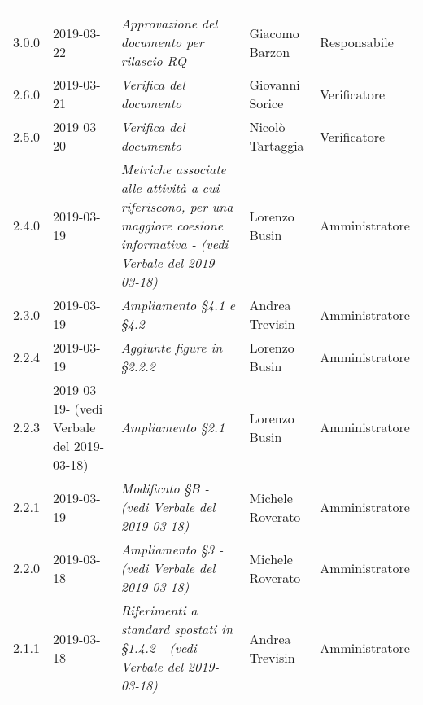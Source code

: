 \newpage 
\section*{}
	\begin{longtable}{C{2cm}|C{2.5cm}|C{4.5cm}|C{2.5cm}|C{3cm}}

		 &  &  &  &   \\
		\endhead
		
		3.0.0 & 2019-03-22 & \emph{Approvazione del documento per rilascio RQ} & Giacomo Barzon & Responsabile \\
		\hline
		
		2.6.0 & 2019-03-21 & \emph{Verifica del documento}  & Giovanni Sorice & Verificatore  \\
		\hline
		
		2.5.0 & 2019-03-20 & \emph{Verifica del documento} & Nicolò Tartaggia & Verificatore  \\
		\hline
		
		2.4.0 & 2019-03-19 & \emph{Metriche associate alle attività a cui riferiscono, per una maggiore coesione informativa - (vedi Verbale del 2019-03-18)} & Lorenzo Busin & Amministratore \\
		\hline
		
		2.3.0 & 2019-03-19 & \emph{Ampliamento §4.1 e §4.2} & Andrea Trevisin & Amministratore \\
		\hline
		
		2.2.4 & 2019-03-19 & \emph{Aggiunte figure in §2.2.2} & Lorenzo Busin & Amministratore \\
		\hline
		
		2.2.3 & 2019-03-19- (vedi Verbale del 2019-03-18) & \emph{Ampliamento §2.1} & Lorenzo Busin & Amministratore \\
		\hline
		
		2.2.1 & 2019-03-19 & \emph{Modificato §B - (vedi Verbale del 2019-03-18)} & Michele Roverato & Amministratore \\
		\hline
		
		2.2.0 & 2019-03-18 & \emph{Ampliamento §3 - (vedi Verbale del 2019-03-18)} & Michele Roverato & Amministratore \\
		\hline
		
		2.1.1 & 2019-03-18 & \emph{Riferimenti a standard spostati in §1.4.2 - (vedi Verbale del 2019-03-18)} & Andrea Trevisin & Amministratore \\
		\hline
		

\end{longtable}
